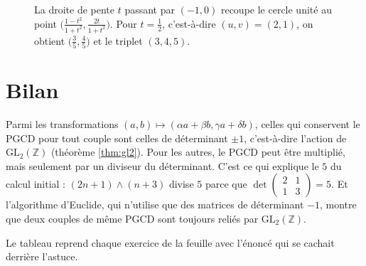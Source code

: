 \documentclass[11pt,a4paper]{article}
\theoremstyle{plain}
\theoremstyle{definition}
\theoremstyle{remark}
\newcommand{\Z}{\mathbb{Z}}
\newcommand{\GL}{\mathrm{GL}}
\newcommand{\pgcd}{\wedge}
\begin{document}
\begin{figure}[h]
\centering
{}
\caption{La droite de pente $t$ passant par $(-1,0)$ recoupe le cercle unité au point $\big(\frac{1-t^2}{1+t^2},\frac{2t}{1+t^2}\big)$. Pour $t=\frac12$, c'est-à-dire $(u,v)=(2,1)$, on obtient $\big(\frac35,\frac45\big)$ et le triplet $(3,4,5)$.}\label{fig:cercle}
\end{figure}

\section{Bilan}

Parmi les transformations $(a,b)\mapsto(\alpha a+\beta b,\gamma a+\delta b)$, celles qui conservent le PGCD pour tout couple sont celles de déterminant $\pm1$, c'est-à-dire l'action de $\GL_2(\Z)$ (théorème \ref{thm:gl2}). Pour les autres, le PGCD peut être multiplié, mais seulement par un diviseur du déterminant. C'est ce qui explique le $5$ du calcul initial : $(2n+1)\pgcd(n+3)$ divise $5$ parce que $\det\begin{pmatrix}2&1\\1&3\end{pmatrix}=5$. Et l'algorithme d'Euclide, qui n'utilise que des matrices de déterminant $-1$, montre que deux couples de même PGCD sont toujours reliés par $\GL_2(\Z)$.

Le tableau reprend chaque exercice de la feuille avec l'énoncé qui se cachait derrière l'astuce.
\end{document}
